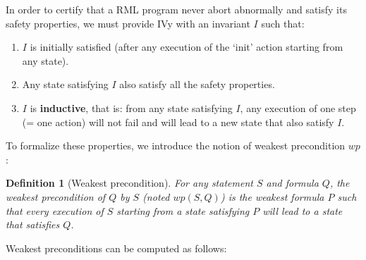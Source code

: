 \documentclass[11pt,a4paper,oldfontcommands,openany]{memoir}
\newtheorem*{definition}{Definition}
\begin{document}
    In order to certify that a RML program never abort abnormally and satisfy its safety properties, we must provide IVy with an invariant \(I\) such that:
    \begin{enumerate}
        \item \(I\) is initially satisfied (after any execution of the `init' action starting from any state).
        \item Any state satisfying \(I\) also satisfy all the safety properties.
        \item \(I\) is \textbf{inductive}, that is: from any state satisfying \(I\), any execution of one step (= one action) will not fail and
        will lead to a new state that also satisfy \(I\). 
    \end{enumerate}

    To formalize these properties, we introduce the notion of weakest precondition \(wp\):
    \begin{definition}[Weakest precondition]
        For any statement \(S\) and formula \(Q\), the weakest precondition of \(Q\) by \(S\) (noted \(wp(S,Q)\)) is the weakest formula \(P\) such that
        every execution of \(S\) starting from a state satisfying \(P\) will lead to a state that satisfies \(Q\).
    \end{definition}

    Weakest preconditions can be computed as follows\cite{Padon:2016:ISV:2908080.2908118}:\\
\end{document}
